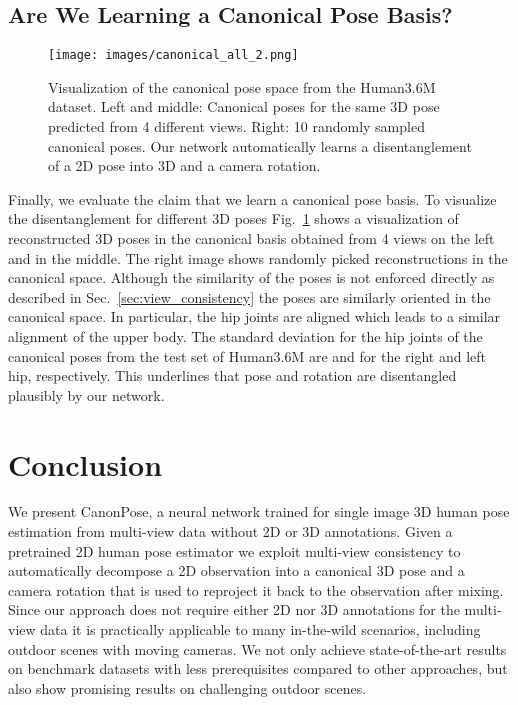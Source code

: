 \documentclass[final]{cvpr}
\begin{document}
\subsection{Are We Learning a Canonical Pose Basis?}
\begin{figure}
	\centering
	\texttt{[image: images/canonical\_all\_2.png]}
	\caption{Visualization of the canonical pose space from the Human3.6M dataset. Left and middle: Canonical poses for the same 3D pose predicted from 4 different views. Right: 10 randomly sampled canonical poses. Our network automatically learns a disentanglement of a 2D pose into 3D and a camera rotation.}
	\label{fig:canonical1}
\end{figure}
Finally, we evaluate the claim that we learn a canonical pose basis.
To visualize the disentanglement for different 3D poses Fig.~\ref{fig:canonical1} shows a visualization of reconstructed 3D poses in the canonical basis obtained from 4 views on the left and in the middle.
The right image shows  randomly picked reconstructions in the canonical space.
Although the similarity of the poses is not enforced directly as described in Sec.~\ref{sec:view_consistency} the poses are similarly oriented in the canonical space.
In particular, the hip joints are aligned which leads to a similar alignment of the upper body.
The standard deviation for the hip joints of the canonical poses from the test set of Human3.6M are  and  for the right and left hip, respectively.
This underlines that pose and rotation are disentangled plausibly by our network.


\section{Conclusion}
We present CanonPose, a neural network trained for single image 3D human pose estimation from multi-view data without 2D or 3D annotations.
Given a pretrained 2D human pose estimator we exploit multi-view consistency to automatically decompose a 2D observation into a canonical 3D pose and a camera rotation that is used to reproject it back to the observation after mixing.
Since our approach does not require either 2D nor 3D annotations for the multi-view data it is practically applicable to many in-the-wild scenarios, including outdoor scenes with moving cameras.
We not only achieve state-of-the-art results on benchmark datasets with less prerequisites compared to other approaches, but also show promising results on challenging outdoor scenes.


{\small


}
\end{document}

